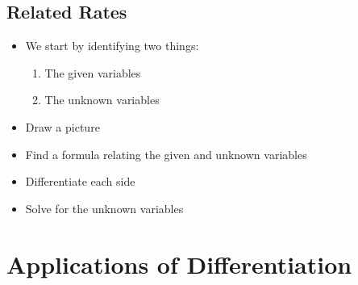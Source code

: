 \documentclass{report}
\begin{document}
		\section{Related Rates}
			\begin{itemize}\addtolength{\leftskip}{2em}
				\item We start by identifying two things:
				\begin{enumerate}\addtolength{\leftskip}{4em}
				\item The given variables
				\item The unknown variables
				\end{enumerate}
				\item Draw a picture
				\item Find a formula relating the given and unknown variables
				\item Differentiate each side
				\item Solve for the unknown variables
			\end{itemize}
\chapter{Applications of Differentiation}
\end{document}
